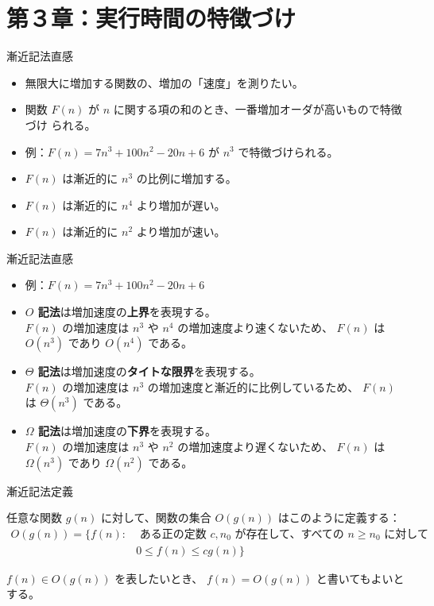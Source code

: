 \documentclass[unicode,11pt,aspectratio=169,notes]{beamer} %
\begin{document}
\section*{第３章：実行時間の特徴づけ}

\begin{frame}
  \sectionpage
\end{frame}

\begin{frame}{漸近記法}{直感}
  \begin{itemize}
    \item 無限大に増加する関数の、増加の「速度」を測りたい。
    \item 関数 $F(n)$ が $n$ に関する項の和のとき、一番増加オーダが高いもので特徴づけ
    られる。
    \item 例：$F(n) = 7n^3 + 100n^2 - 20n + 6$ が $n^3$ で特徴づけられる。
    \item $F(n)$ は漸近的に $n^3$ の比例に増加する。
    \item $F(n)$ は漸近的に $n^4$ より増加が遅い。
    \item $F(n)$ は漸近的に $n^2$ より増加が速い。
  \end{itemize}
\end{frame}

\begin{frame}{漸近記法}{直感}
  \begin{itemize}
    \item 例：$F(n) = 7n^3 + 100n^2 - 20n + 6$
    \item \textbf{$O$ 記法}は増加速度の\textbf{上界}を表現する。\\
    $F(n)$ の増加速度は $n^3$ や $n^4$ の増加速度より速くないため、
    $F(n)$ は $O(n^3)$ であり $O(n^4)$ である。
    \item \textbf{$\Theta$ 記法}は増加速度の\textbf{タイトな限界}を表現する。\\
    $F(n)$ の増加速度は $n^3$ の増加速度と漸近的に比例しているため、
    $F(n)$ は $\Theta(n^3)$ である。
    \item \textbf{$\Omega$ 記法}は増加速度の\textbf{下界}を表現する。\\
    $F(n)$ の増加速度は $n^3$ や $n^2$ の増加速度より遅くないため、
    $F(n)$ は $\Omega(n^3)$ であり $\Omega(n^2)$ である。
  \end{itemize}
\end{frame}

\begin{frame}{漸近記法}{定義}
  \begin{definition}[$O$記法 -- 漸近的上界]
    任意な関数 $g(n)$ に対して、関数の集合 $O(g(n))$ はこのように定義する：
    \begin{align*}
      O(g(n)) = \{
        f(n) : & \text{ ある正の定数 } c, n_0 \text{ が存在して、すべての }
        n \geq n_0 \text{ に対して } \\
        & 0 \leq f(n) \leq cg(n)
      \}
    \end{align*}
  \end{definition}
  
  $f(n) \in O(g(n))$ を表したいとき、 $f(n) = O(g(n))$ と書いてもよいとする。
\end{frame}
\end{document}
